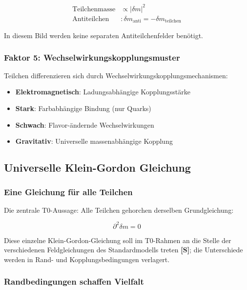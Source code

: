 	\begin{align}
		\text{Teilchenmasse} &\propto |\delta m|^2 \\
		\text{Antiteilchen} &: \delta m_{\text{anti}} = -\delta m_{\text{teilchen}}
	\end{align}
	
	In diesem Bild werden keine separaten Antiteilchenfelder benötigt.
	
	\subsubsection{Faktor 5: Wechselwirkungskopplungsmuster}
	\label{subsubsec:kopplungsmuster}
	
	Teilchen differenzieren sich durch Wechselwirkungskopplungsmechanismen:
	\begin{itemize}
		\item \textbf{Elektromagnetisch}: Ladungsabhängige Kopplungsstärke
		\item \textbf{Stark}: Farbabhängige Bindung (nur Quarks)
		\item \textbf{Schwach}: Flavor-ändernde Wechselwirkungen
		\item \textbf{Gravitativ}: Universelle massenabhängige Kopplung
	\end{itemize}
	
	\subsection{Universelle Klein-Gordon Gleichung}
	\label{subsec:universelle_klein_gordon}
	
	\subsubsection{Eine Gleichung für alle Teilchen}
	\label{subsubsec:eine_gleichung}
	
	Die zentrale T0-Aussage: Alle Teilchen gehorchen derselben Grundgleichung:
	
	\begin{equation}
		\boxed{\partial^2 \delta m = 0}
		\label{eq:universelle_gleichung}
	\end{equation}
	
	Diese einzelne Klein-Gordon-Gleichung soll im T0-Rahmen an die Stelle der verschiedenen Feldgleichungen des Standardmodells treten \textbf{[S]}; die Unterschiede werden in Rand- und Kopplungsbedingungen verlagert.
	
	\subsubsection{Randbedingungen schaffen Vielfalt}
	\label{subsubsec:randbedingungen}
	
